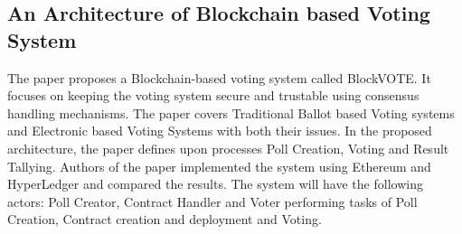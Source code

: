 \documentclass{IEEEtran}
\begin{document}
    \subsection{An Architecture of Blockchain based Voting System \cite{angsuchotmetee2019blockvote}}
      The paper proposes a Blockchain-based voting system called BlockVOTE. It focuses on keeping the voting system secure and trustable using consensus handling mechanisms. The paper covers Traditional Ballot based Voting systems and Electronic based Voting Systems with both their issues. In the proposed architecture, the paper defines upon processes Poll Creation, Voting and Result Tallying. Authors of the paper implemented the system using Ethereum and HyperLedger and compared the results. The system will have the following actors: Poll Creator, Contract Handler and Voter performing tasks of Poll Creation, Contract creation and deployment and Voting.
\end{document}
